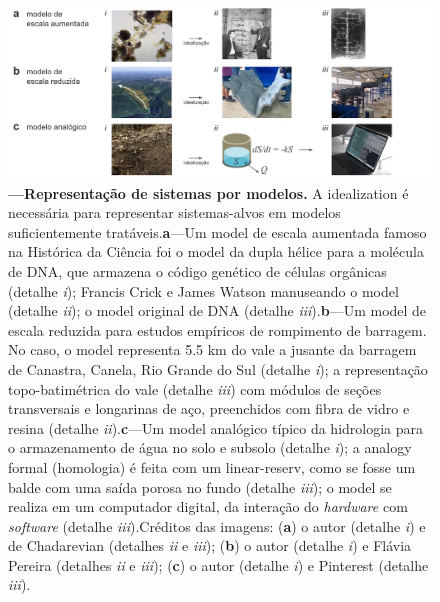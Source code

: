 \documentclass[./main.tex]{subfiles}
\begin{document}
\begin{figure}[t!] %
	\centering				
	\includegraphics[width=0.95\linewidth]{figs/fig_representation.jpg}		
	\caption[Representação de sistemas por modelos]
	{\textbf{---\;Representação de sistemas por modelos.}
        A \gls{idealization} é necessária para representar sistemas-alvos em modelos suficientemente tratáveis.\;\textbf{a}\;---\;Um \gls{model} de escala aumentada famoso na Histórica da Ciência foi o \gls{model} da dupla hélice para a molécula de DNA, que armazena o código genético de células orgânicas (detalhe \textrm{\textit{i}}); Francis Crick e James Watson manuseando o \gls{model} (detalhe \textrm{\textit{ii}}); o \gls{model} original de DNA (detalhe \textrm{\textit{iii}}).\;\textbf{b}\;---\;Um \gls{model} de escala reduzida para estudos empíricos de rompimento de barragem. No caso, o \gls{model} representa 5.5 km do vale a jusante da barragem de Canastra, Canela, Rio Grande do Sul (detalhe \textrm{\textit{i}}); a representação topo-batimétrica do vale (detalhe \textrm{\textit{iii}}) com módulos de seções transversais e longarinas de aço, preenchidos com fibra de vidro e resina (detalhe \textrm{\textit{ii}}).\;\textbf{c}\;---\;Um \gls{model} analógico típico da hidrologia para o armazenamento de água no solo e subsolo (detalhe \textrm{\textit{i}}); a \gls{analogy} formal (homologia) é feita com um \gls{linear-reserv}, como se fosse um balde com uma saída porosa no fundo (detalhe \textrm{\textit{iii}}); o \gls{model} se realiza em um computador digital, da interação do \textit{hardware} com \textit{software} (detalhe \textrm{\textit{iii}}).\;Créditos das imagens: (\textbf{a}) o autor (detalhe \textrm{\textit{i}}) e de Chadarevian \cite{deChadarevian2003} (detalhes \textrm{\textit{ii}} e \textrm{\textit{iii}}); (\textbf{b}) o autor (detalhe \textrm{\textit{i}}) e Flávia Pereira \cite{Pereira2023} (detalhes \textrm{\textit{ii}} e \textrm{\textit{iii}}); (\textbf{c}) o autor (detalhe \textrm{\textit{i}}) e Pinterest (detalhe \textrm{\textit{iii}}).
	}
\label{fig:sys:represen}  %
\end{figure}
\end{document}
